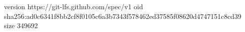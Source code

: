 version https://git-lfs.github.com/spec/v1
oid sha256:ad0c6341f8bb2cf8f0105c6a3b7343f578462ed37585f08620d4747151c8cd39
size 349692
